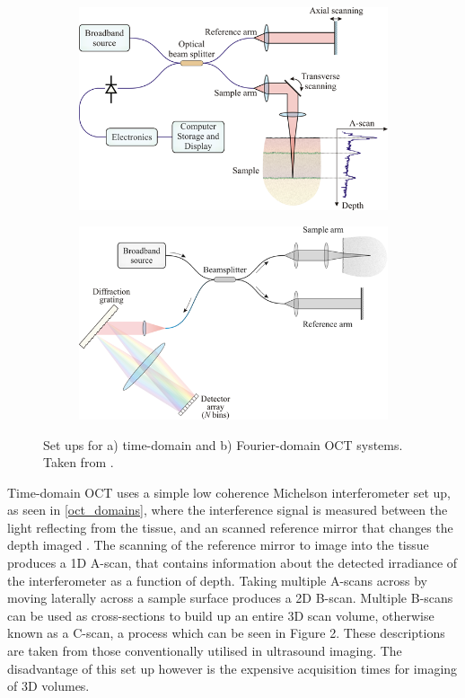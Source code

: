 \begin{figure}
	\centering
    \begin{subfigure}{0.45\textwidth}
    	\centering
        \includegraphics[width=\textwidth]{figures/time_domain}
    \end{subfigure}
    \quad
    \begin{subfigure}{0.45\textwidth}
    	\centering
        \includegraphics[width=\textwidth]{figures/fourier_domain.png}
    \end{subfigure}
    \caption{Set ups for a) time-domain and b) Fourier-domain OCT systems. Taken from \cite{optical+biomedical_engineering_laboratory_introduction_nodate}.}
    \label{oct_domain}	
\end{figure}

Time-domain OCT uses a simple low coherence Michelson interferometer set up, as seen in \autoref{oct_domains}, where the interference signal is measured between the light reflecting from the tissue, and an scanned reference mirror that changes the depth imaged \cite{huang_optical_1991}. The scanning of the reference mirror to image into the tissue produces a 1D A-scan, that contains information about the detected irradiance of the interferometer as a function of depth. Taking multiple A-scans across by moving laterally across a sample surface produces a 2D B-scan. Multiple B-scans can be used as cross-sections to build up an entire 3D scan volume, otherwise known as a C-scan, a process which can be seen in Figure 2. These descriptions are taken from those conventionally utilised in ultrasound imaging. The disadvantage of this set up however is the expensive acquisition times for imaging of 3D volumes.

